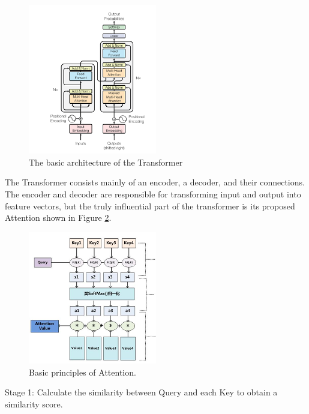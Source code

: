 \documentclass[10pt,twocolumn,letterpaper]{article}
\begin{document}
\begin{figure}
  \centering %
  \includegraphics[width=0.5\textwidth]{image4.png} %
  \caption{The basic architecture of the Transformer} %
  \label{fig4}
\end{figure}

The Transformer consists mainly of an encoder, a decoder, and their connections. The encoder and decoder are responsible for transforming input and output into feature vectors, but the truly influential part of the transformer is its proposed Attention  shown in Figure \ref{fig5}.

\begin{figure}
  \centering %
  \includegraphics[width=0.5\textwidth]{image5.png} %
  \caption{Basic principles of Attention.} %
  \label{fig5}
\end{figure}

Stage 1: Calculate the similarity between Query and each Key to obtain a similarity score.
\end{document}
